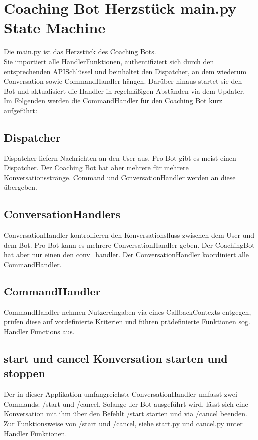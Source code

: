     \section{Coaching Bot Herzstück \- main.py \- State Machine}
        Die main.py ist das Herzstück des Coaching Bots.\\
        Sie importiert alle Handler\-Funktionen, authentifiziert sich durch den entsprechenden API\-Schlüssel und beinhaltet den Dispatcher, an dem wiederum Conversation\- sowie CommandHandler hängen. Darüber hinaus startet sie den Bot und aktualisiert die Handler in regelmäßigen Abständen via dem Updater.\\

        Im Folgenden werden die CommandHandler für den Coaching Bot kurz aufgeführt:
        
        \subsection{Dispatcher}
            Dispatcher liefern Nachrichten an den User aus. Pro Bot gibt es meist einen Dispatcher. Der Coaching Bot hat aber mehrere für mehrere Konversationsstränge. Command\- und ConversationHandler werden an diese übergeben.


        \subsection{ConversationHandlers}
            ConversationHandler kontrollieren den Konversationsfluss zwischen dem User und dem Bot. Pro Bot kann es mehrere ConversationHandler geben. Der CoachingBot hat aber nur einen \- den conv\_handler. Der ConversationHandler koordiniert alle CommandHandler.


        \subsection{CommandHandler}
            CommandHandler nehmen Nutzereingaben via eines CallbackContexts entgegen, prüfen diese auf vordefinierte Kriterien und führen prädefinierte Funktionen \- sog. Handler Functions aus.


        \subsection{start und cancel \- Konversation starten und stoppen}
            Der in dieser Applikation umfangreichste ConversationHandler umfasst zwei Commands: /start und /cancel. Solange der Bot ausgeführt wird, lässt sich eine Konversation mit ihm über den Befehlt /start starten und via /cancel beenden. Zur Funktionsweise von /start und /cancel, siehe start.py und cancel.py unter Handler Funktionen. 


